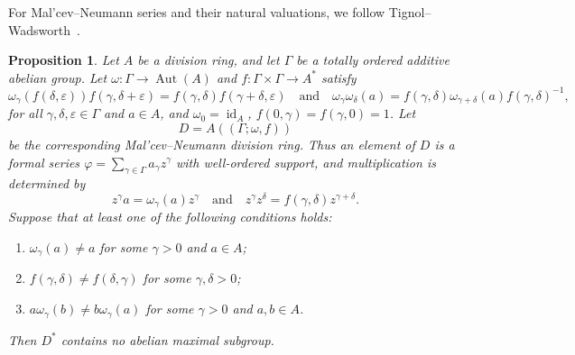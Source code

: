 \documentclass[11pt]{amsart}
\newtheorem{proposition}[theorem]{Proposition}
\theoremstyle{definition}
\begin{document}
For Mal'cev--Neumann series and their natural valuations, we follow
Tignol--Wadsworth~\cite[§1.1.4, pp.~7--9]{TW}.

\begin{proposition}
\label{prop:malcev-neumann}
Let $A$ be a division ring, and let $\Gamma$ be a totally ordered additive
abelian group.  Let $\omega:\Gamma\to \operatorname{Aut}(A)$ and
$f:\Gamma\times\Gamma\to A^*$ satisfy
\[
        \omega_\gamma(f(\delta,\varepsilon))f(\gamma,\delta+\varepsilon)
        =
        f(\gamma,\delta)f(\gamma+\delta,\varepsilon)
        \quad\text{and}\quad
        \omega_\gamma\omega_\delta(a)
        =
        f(\gamma,\delta)\omega_{\gamma+\delta}(a)f(\gamma,\delta)^{-1},
\]
for all $\gamma,\delta,\varepsilon\in\Gamma$ and $a\in A$, and
$\omega_0=\operatorname{id}_A$, $f(0,\gamma)=f(\gamma,0)=1$.  Let
\[
        D=A((\Gamma;\omega,f))
\]
be the corresponding Mal'cev--Neumann division ring.  Thus an element of
$D$ is a formal series $\varphi=\sum_{\gamma\in\Gamma}a_\gamma z^\gamma$ with well-ordered support, and multiplication is determined by
\[
        z^\gamma a=\omega_\gamma(a)z^\gamma\quad\text{and}\quad
        z^\gamma z^\delta=f(\gamma,\delta)z^{\gamma+\delta}.
\]
Suppose that at least one of the following conditions holds:
\begin{enumerate}[label=\textup{(\arabic*)}]
        \item $\omega_\gamma(a)\ne a$ for some $\gamma>0$ and $a\in A$;
        \item $f(\gamma,\delta)\ne f(\delta,\gamma)$ for some
        $\gamma,\delta>0$;
        \item $a\omega_\gamma(b)\ne b\omega_\gamma(a)$ for some
        $\gamma>0$ and $a,b\in A$.
\end{enumerate}
Then $D^*$ contains no abelian maximal subgroup.
\end{proposition}
\end{document}
